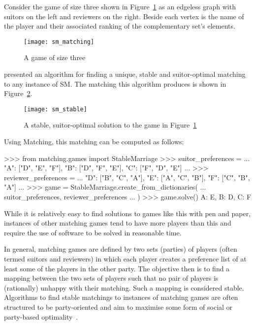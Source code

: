 Consider the game of size three shown in Figure~\ref{fig:sm_matching} as an
edgeless graph with suitors on the left and reviewers on the right. Beside each
vertex is the name of the player and their associated ranking of the
complementary set’s elements.

\begin{figure}
    \centering
    \texttt{[image: sm\_matching]}
    \caption{A game of size three}\label{fig:sm_matching}
\end{figure}


\cite{Gale1962} presented an algorithm for finding a unique, stable and
suitor-optimal matching to any instance of SM. The matching this algorithm
produces is shown in Figure~\ref{fig:sm_stable}.

\begin{figure}
    \centering
    \texttt{[image: sm\_stable]}
    \caption{%
        A stable, suitor-optimal solution to the game in
        Figure~\ref{fig:sm_matching}
    }\label{fig:sm_stable}
\end{figure}

Using Matching, this matching can be computed as follows:

\begin{usagepy}
>>> from matching.games import StableMarriage
>>> suitor_preferences = {
...     "A": ["D", "E", "F"], "B": ["D", "F", "E"], "C": ["F", "D", "E"]
... }
>>> reviewer_preferences = {
...     "D": ["B", "C", "A"], "E": ["A", "C", "B"], "F": ["C", "B", "A"]
... }
>>> game = StableMarriage.create_from_dictionaries(
...     suitor_preferences, reviewer_preferences
... )
>>> game.solve()
{A: E, B: D, C: F}

\end{usagepy}

While it is relatively easy to find solutions to games like this with pen and
paper, instances of other matching games tend to have more players than this and
require the use of software to be solved in reasonable time.

In general, matching games are defined by two sets (parties) of players (often
termed suitors and reviewers) in which each player creates a preference list of
at least some of the players in the other party. The objective then is to find a
mapping between the two sets of players such that no pair of players is
(rationally) unhappy with their matching. Such a mapping is considered stable.
Algorithms to find stable matchings to instances of matching games are often
structured to be party-oriented and aim to maximise some form of social or
party-based optimality~\cite{Fuku2006,Gale1962,Kwanashie2015}.

